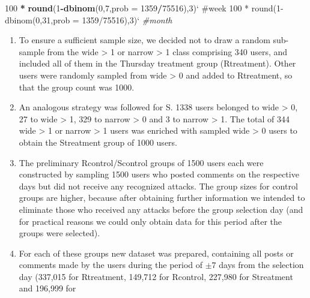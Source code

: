 \documentclass[10pt,]{scrartcl}
\newenvironment{Shaded}{\begin{snugshade}}{\end{snugshade}}
\newcommand{\KeywordTok}[1]{\textcolor[rgb]{0.13,0.29,0.53}{\textbf{#1}}}
\newcommand{\DataTypeTok}[1]{\textcolor[rgb]{0.13,0.29,0.53}{#1}}
\newcommand{\DecValTok}[1]{\textcolor[rgb]{0.00,0.00,0.81}{#1}}
\newcommand{\StringTok}[1]{\textcolor[rgb]{0.31,0.60,0.02}{#1}}
\newcommand{\CommentTok}[1]{\textcolor[rgb]{0.56,0.35,0.01}{\textit{#1}}}
\newcommand{\OperatorTok}[1]{\textcolor[rgb]{0.81,0.36,0.00}{\textbf{#1}}}
\newcommand{\NormalTok}[1]{#1}
\begin{document}
\scriptsize

\begin{Shaded}
\begin{Highlighting}[]
\DecValTok{100}  \OperatorTok{*}\StringTok{ }\KeywordTok{round}\NormalTok{(}\DecValTok{1}\OperatorTok{-}\KeywordTok{dbinom}\NormalTok{(}\DecValTok{0}\NormalTok{,}\DecValTok{7}\NormalTok{,}\DataTypeTok{prob =} \DecValTok{1359}\OperatorTok{/}\DecValTok{75516}\NormalTok{),}\DecValTok{3}\NormalTok{)}\StringTok{`}\DataTypeTok{ #week}
\DataTypeTok{100 * round(1-dbinom(0,31,prob = 1359/75516),3)}\StringTok{`} \CommentTok{#month}
\end{Highlighting}
\end{Shaded}

\normalsize

\begin{enumerate}
\def\labelenumi{\arabic{enumi}.}
\setcounter{enumi}{6}
\item
  To ensure a sufficient sample size, we decided not to draw a random
  sub-sample from the \textsf{wide > 1} or \textsf{narrow > 1} class
  comprising 340 users, and included all of them in the Thursday
  treatment group (\textsf{Rtreatment}). Other users were randomly
  sampled from \textsf{wide > 0} and added to \textsf{Rtreatment}, so
  that the group count was 1000.
\item
  An analogous strategy was followed for \textsf{S}. 1338 users belonged
  to \textsf{wide > 0}, 27 to \textsf{wide > 1}, 329 to
  \textsf{narrow > 0} and 3 to \textsf{narrow > 1}. The total of 344
  \textsf{wide > 1} or \textsf{narrow > 1} users was enriched with
  sampled \textsf{wide > 0} users to obtain the \textsf{Streatment}
  group of 1000 users.
\item
  The preliminary \textsf{Rcontrol}/\textsf{Scontrol} groups of 1500
  users each were constructed by sampling 1500 users who posted comments
  on the respective days but did not receive any recognized attacks. The
  group sizes for control groups are higher, because after obtaining
  further information we intended to eliminate those who received any
  attacks before the group selection day (and for practical reasons we
  could only obtain data for this period after the groups were
  selected).
\item
  For each of these groups new dataset was prepared, containing all
  posts or comments made by the users during the period of \(\pm 7\)
  days from the selection day (337,015 for \textsf{Rtreatment}, 149,712
  for \textsf{Rcontrol}, 227,980 for \textsf{Streatment} and 196,999 for

\end{enumerate}
\end{document}
